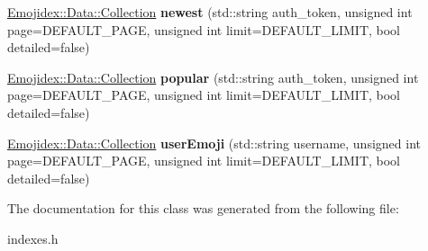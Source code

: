 \begin{DoxyCompactItemize}
\item 
\hyperlink{classEmojidex_1_1Data_1_1Collection}{Emojidex\+::\+Data\+::\+Collection} {\bfseries newest} (std\+::string auth\+\_\+token, unsigned int page=D\+E\+F\+A\+U\+L\+T\+\_\+\+P\+A\+GE, unsigned int limit=D\+E\+F\+A\+U\+L\+T\+\_\+\+L\+I\+M\+IT, bool detailed=false)\hypertarget{classEmojidex_1_1Service_1_1Indexes_aa3033253b1d6fed4ec3046ffbc094ed7}{}\label{classEmojidex_1_1Service_1_1Indexes_aa3033253b1d6fed4ec3046ffbc094ed7}

\item 
\hyperlink{classEmojidex_1_1Data_1_1Collection}{Emojidex\+::\+Data\+::\+Collection} {\bfseries popular} (std\+::string auth\+\_\+token, unsigned int page=D\+E\+F\+A\+U\+L\+T\+\_\+\+P\+A\+GE, unsigned int limit=D\+E\+F\+A\+U\+L\+T\+\_\+\+L\+I\+M\+IT, bool detailed=false)\hypertarget{classEmojidex_1_1Service_1_1Indexes_a15f63f13947e746cbc4e034973183c77}{}\label{classEmojidex_1_1Service_1_1Indexes_a15f63f13947e746cbc4e034973183c77}

\item 
\hyperlink{classEmojidex_1_1Data_1_1Collection}{Emojidex\+::\+Data\+::\+Collection} {\bfseries user\+Emoji} (std\+::string username, unsigned int page=D\+E\+F\+A\+U\+L\+T\+\_\+\+P\+A\+GE, unsigned int limit=D\+E\+F\+A\+U\+L\+T\+\_\+\+L\+I\+M\+IT, bool detailed=false)\hypertarget{classEmojidex_1_1Service_1_1Indexes_ac489e53250311163cea342581ee5730d}{}\label{classEmojidex_1_1Service_1_1Indexes_ac489e53250311163cea342581ee5730d}

\end{DoxyCompactItemize}


The documentation for this class was generated from the following file\+:\begin{DoxyCompactItemize}
\item 
indexes.\+h\end{DoxyCompactItemize}
